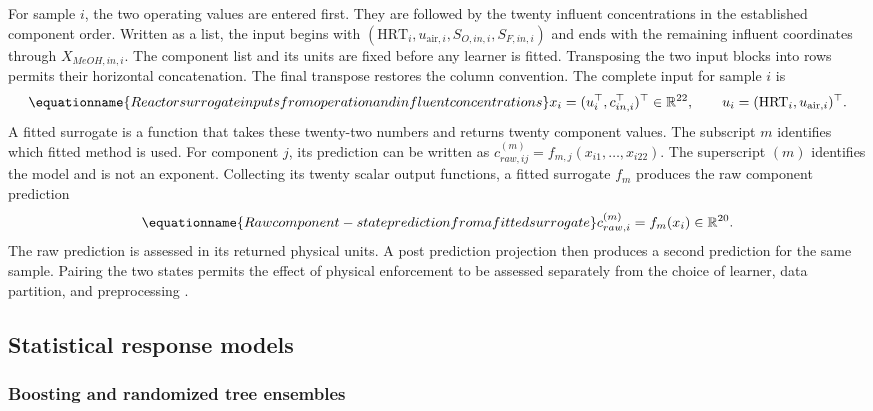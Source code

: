 For sample $i$, the two operating values are entered first. They are followed by the twenty influent concentrations in the established component order. Written as a list, the input begins with $(\mathrm{HRT}_i,u_{\mathrm{air},i},S_{O,in,i},S_{F,in,i})$ and ends with the remaining influent coordinates through $X_{MeOH,in,i}$. The component list and its units are fixed before any learner is fitted. Transposing the two input blocks into rows permits their horizontal concatenation. The final transpose restores the column convention. The complete input for sample $i$ is
\begin{equation}
\equationname{Reactor surrogate inputs from operation and influent concentrations}
x_i=(u_i^\top,c_{in,i}^\top)^\top\in\mathbb{R}^{22},\qquad
u_i=(\mathrm{HRT}_i,u_{\mathrm{air},i})^\top.
\label{eq:surrogate_input_vector}
\end{equation}
A fitted surrogate is a function that takes these twenty-two numbers and returns twenty component values. The subscript $m$ identifies which fitted method is used. For component $j$, its prediction can be written as $c_{raw,ij}^{(m)}=f_{m,j}(x_{i1},\ldots,x_{i22})$. The superscript $(m)$ identifies the model and is not an exponent. Collecting its twenty scalar output functions, a fitted surrogate $f_m$ produces the raw component prediction
\begin{equation}
\equationname{Raw component-state prediction from a fitted surrogate}
c_{raw,i}^{(m)}=f_m(x_i)\in\mathbb{R}^{20}.
\label{eq:surrogate_raw_state}
\end{equation}
The raw prediction is assessed in its returned physical units. A post prediction projection then produces a second prediction for the same sample. Pairing the two states permits the effect of physical enforcement to be assessed separately from the choice of learner, data partition, and preprocessing \citep{SturmSilva2024,KircherVotsmeier2025}.

\subsection{Statistical response models}

\subsubsection{Boosting and randomized tree ensembles}

